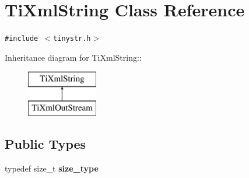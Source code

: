 \section{TiXmlString Class Reference}
\label{classTiXmlString}
{\tt \#include $<$tinystr.h$>$}

Inheritance diagram for TiXmlString::\begin{figure}[H]
\begin{center}
\leavevmode
\includegraphics[height=2cm]{classTiXmlString}
\end{center}
\end{figure}
\subsection*{Public Types}
\begin{CompactItemize}
\item 
typedef size\_\-t {\bf size\_\-type}
\end{CompactItemize}
